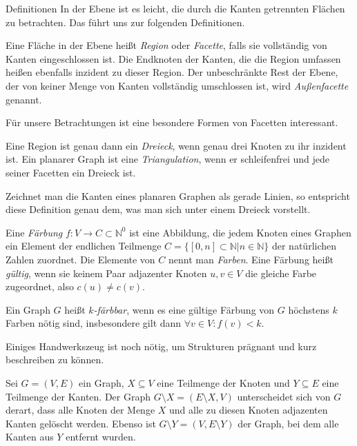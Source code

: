 \begin{chapter}{Definitionen}
  In der Ebene ist es leicht, die durch die Kanten getrennten Flächen zu betrachten. Das führt uns zur folgenden Definitionen.
  
  \begin{definition}
   Eine Fläche in der Ebene heißt \textit{Region} oder \textit{Facette}, falls sie vollständig von Kanten eingeschlossen ist. Die Endknoten der Kanten, die die Region umfassen heißen ebenfalls inzident zu dieser Region. Der unbeschränkte Rest der Ebene, der von keiner Menge von Kanten vollständig umschlossen ist, wird \textit{Außenfacette} genannt.
  \end{definition}
  
  Für unsere Betrachtungen ist eine besondere Formen von Facetten interessant. 
  
  \begin{definition}
   Eine Region ist genau dann ein \textit{Dreieck}, wenn genau drei Knoten zu ihr inzident ist. Ein planarer Graph ist eine \textit{Triangulation}, wenn er schleifenfrei und jede seiner Facetten ein Dreieck ist.
  \end{definition}
    
  Zeichnet man die Kanten eines planaren Graphen als gerade Linien, so entspricht diese Definition genau dem, was man sich unter einem Dreieck vorstellt.
  
  \begin{definition}
   Eine \textit{Färbung} $f: V \rightarrow C \subset \mathbb{N}^0$ ist eine Abbildung, die jedem Knoten eines Graphen ein Element der endlichen Teilmenge $C = \{[0,n] \subset \mathbb{N}| n \in \mathbb{N}\}$ der natürlichen Zahlen zuordnet. Die Elemente von $C$ nennt man \textit{Farben}. Eine Färbung heißt \textit{gültig}, wenn sie keinem Paar adjazenter Knoten $u,v \in V$ die gleiche Farbe zugeordnet, also $c(u) \neq c(v)$. 
  \end{definition}
  
  \begin{definition}[$k$-Färbbarkeit]
   Ein Graph $G$ heißt \textit{$k$-färbbar}, wenn es eine gültige Färbung von $G$ höchstens $k$ Farben nötig sind, insbesondere gilt dann $\forall v \in V: f(v) < k$.
  \end{definition}
  
  Einiges Handwerkszeug ist noch nötig, um Strukturen prägnant und kurz beschreiben zu können.
  
  \begin{definition}
   Sei $G=(V,E)$ ein Graph, $X \subseteq V$ eine Teilmenge der Knoten und $Y \subseteq E$ eine Teilmenge der Kanten. Der Graph $G\setminus X = (E\setminus X,V)$ unterscheidet sich von $G$ derart, dass alle Knoten der Menge $X$ und alle zu diesen Knoten adjazenten Kanten gelöscht werden. Ebenso ist $G\setminus Y = (V,E\setminus Y)$ der Graph, bei dem alle Kanten aus $Y$ entfernt wurden.
  \end{definition}


\end{chapter}